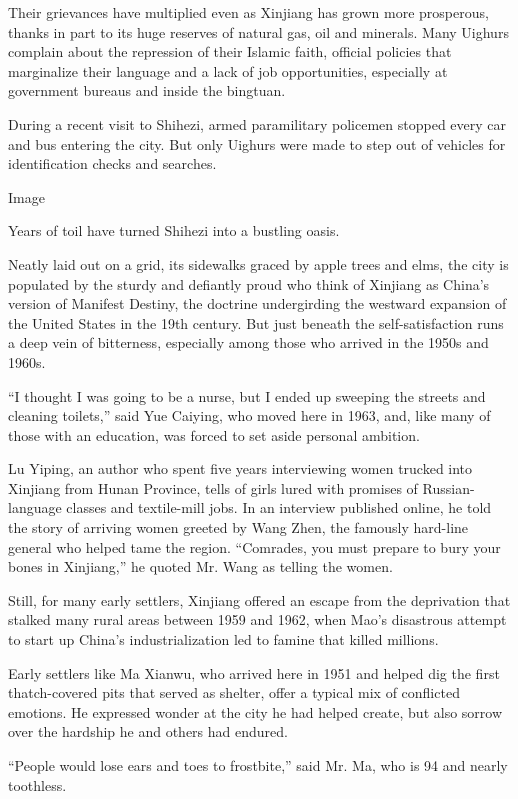 Their grievances have multiplied even as Xinjiang has grown more
prosperous, thanks in part to its huge reserves of natural gas, oil and
minerals. Many Uighurs complain about the repression of their Islamic
faith, official policies that marginalize their language and a lack of
job opportunities, especially at government bureaus and inside the
bingtuan.

During a recent visit to Shihezi, armed paramilitary policemen stopped
every car and bus entering the city. But only Uighurs were made to step
out of vehicles for identification checks and searches.

Image

Years of toil have turned Shihezi into a bustling oasis.

Neatly laid out on a grid, its sidewalks graced by apple trees and elms,
the city is populated by the sturdy and defiantly proud who think of
Xinjiang as China's version of Manifest Destiny, the doctrine
undergirding the westward expansion of the United States in the 19th
century. But just beneath the self-satisfaction runs a deep vein of
bitterness, especially among those who arrived in the 1950s and 1960s.

``I thought I was going to be a nurse, but I ended up sweeping the
streets and cleaning toilets,'' said Yue Caiying, who moved here in
1963, and, like many of those with an education, was forced to set aside
personal ambition.

Lu Yiping, an author who spent five years interviewing women trucked
into Xinjiang from Hunan Province, tells of girls lured with promises of
Russian-language classes and textile-mill jobs. In an interview
published online, he told the story of arriving women greeted by Wang
Zhen, the famously hard-line general who helped tame the region.
``Comrades, you must prepare to bury your bones in Xinjiang,'' he quoted
Mr. Wang as telling the women.

Still, for many early settlers, Xinjiang offered an escape from the
deprivation that stalked many rural areas between 1959 and 1962, when
Mao's disastrous attempt to start up China's industrialization led to
famine that killed millions.

Early settlers like Ma Xianwu, who arrived here in 1951 and helped dig
the first thatch-covered pits that served as shelter, offer a typical
mix of conflicted emotions. He expressed wonder at the city he had
helped create, but also sorrow over the hardship he and others had
endured.

``People would lose ears and toes to frostbite,'' said Mr. Ma, who is 94
and nearly toothless.

